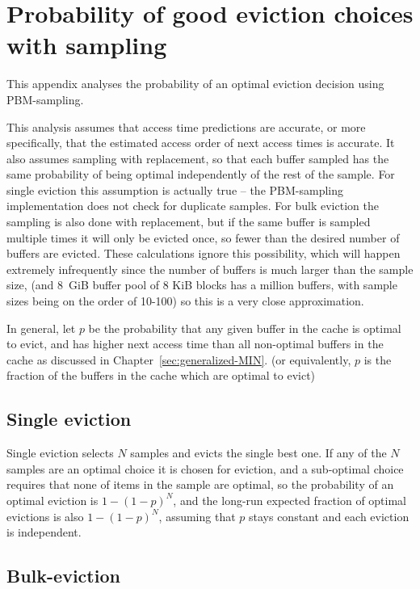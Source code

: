 
\chapter{Probability of good eviction choices with sampling\label{sec:sampling-probabilities}}

This appendix analyses the probability of an optimal eviction decision using PBM-sampling. 

This analysis assumes that access time predictions are accurate, or more specifically, that the estimated access order of next access times is accurate. It also assumes sampling with replacement, so that each buffer sampled has the same probability of being optimal independently of the rest of the sample. For single eviction this assumption is actually true -- the PBM-sampling implementation does not check for duplicate samples. For bulk eviction the sampling is also done with replacement, but if the same buffer is sampled multiple times it will only be evicted once, so fewer than the desired number of buffers are evicted. These calculations ignore this possibility, which will happen extremely infrequently since the number of buffers is much larger than the sample size, (and 8~GiB buffer pool of 8 KiB blocks has a million buffers, with sample sizes being on the order of 10-100) so this is a very close approximation.


In general, let $p$ be the probability that any given buffer in the cache is optimal to evict, and has higher next access time than all non-optimal buffers in the cache as discussed in Chapter~\ref{sec:generalized-MIN}. (or equivalently, $p$ is the fraction of the buffers in the cache which are optimal to evict)



\section{Single eviction}

Single eviction selects $N$ samples and evicts the single best one. If any of the $N$ samples are an optimal choice it is chosen for eviction, and a sub-optimal choice requires that none of items in the sample are optimal, so the probability of an optimal eviction is $1-(1-p)^N$, and the long-run expected fraction of optimal evictions is also $1-(1-p)^N$, assuming that $p$ stays constant and each eviction is independent.  %


\section{Bulk-eviction}

